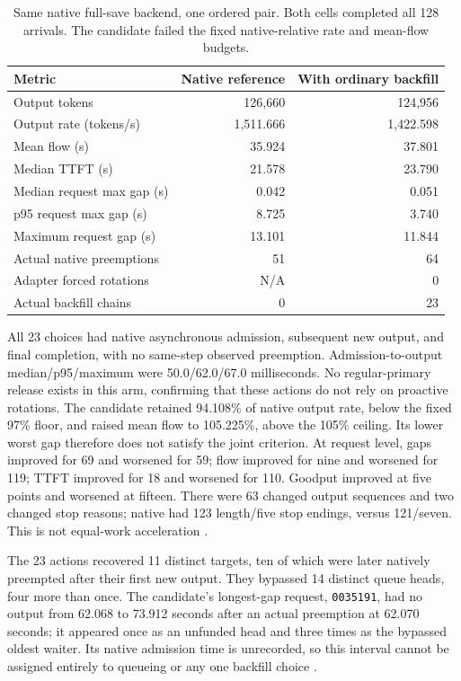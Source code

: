 \documentclass[10pt]{article}
\begin{document}
\begin{table}[t]
\centering\small
\caption{Same native full-save backend, one ordered pair. Both cells completed all 128 arrivals. The candidate failed the fixed native-relative rate and mean-flow budgets.}
\label{tab:nativeonly}
\begin{tabular}{lrr}
\toprule
Metric & Native reference & With ordinary backfill \\
\midrule
Output tokens & 126,660 & 124,956 \\
Output rate (tokens/s) & 1,511.666 & 1,422.598 \\
Mean flow (s) & 35.924 & 37.801 \\
Median TTFT (s) & 21.578 & 23.790 \\
Median request max gap (s) & 0.042 & 0.051 \\
p95 request max gap (s) & 8.725 & 3.740 \\
Maximum request gap (s) & 13.101 & 11.844 \\
Actual native preemptions & 51 & 64 \\
Adapter forced rotations & N/A & 0 \\
Actual backfill chains & 0 & 23 \\
\bottomrule
\end{tabular}
\end{table}

All 23 choices had native asynchronous admission, subsequent new output, and final completion, with no same-step observed preemption. Admission-to-output median/p95/maximum were 50.0/62.0/67.0 milliseconds. No regular-primary release exists in this arm, confirming that these actions do not rely on proactive rotations. The candidate retained 94.108\% of native output rate, below the fixed 97\% floor, and raised mean flow to 105.225\%, above the 105\% ceiling. Its lower worst gap therefore does not satisfy the joint criterion. At request level, gaps improved for 69 and worsened for 59; flow improved for nine and worsened for 119; TTFT improved for 18 and worsened for 110. Goodput improved at five points and worsened at fifteen. There were 63 changed output sequences and two changed stop reasons; native had 123 length/five stop endings, versus 121/seven. This is not equal-work acceleration \cite{nativeonly}.

The 23 actions recovered 11 distinct targets, ten of which were later natively preempted after their first new output. They bypassed 14 distinct queue heads, four more than once. The candidate's longest-gap request, \texttt{0035191}, had no output from 62.068 to 73.912 seconds after an actual preemption at 62.070 seconds; it appeared once as an unfunded head and three times as the bypassed oldest waiter. Its native admission time is unrecorded, so this interval cannot be assigned entirely to queueing or any one backfill choice \cite{nativeonlypeer}.
\end{document}
